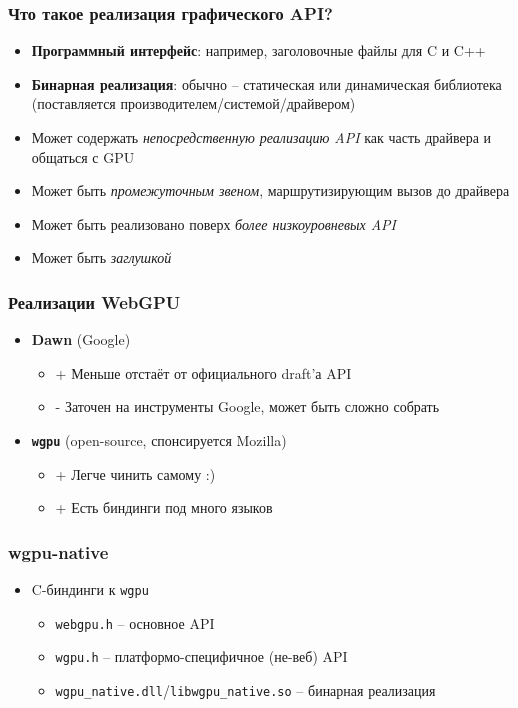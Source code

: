 \documentclass[10pt]{beamer}
\begin{document}
\begin{frame}[fragile]
\frametitle{Что такое реализация графического API?}
\pause
\begin{itemize}
\item \textbf{Программный интерфейс}: например, заголовочные файлы для C и C++
\pause
\item \textbf{Бинарная реализация}: обычно -- статическая или динамическая библиотека (поставляется производителем/системой/драйвером)
\pause
\item Может содержать \textit{непосредственную реализацию API} как часть драйвера и общаться с GPU
\pause
\item Может быть \textit{промежуточным звеном}, маршрутизирующим вызов до драйвера
\pause
\item Может быть реализовано поверх \textit{более низкоуровневых API}
\pause
\item Может быть \textit{заглушкой}
\end{itemize}
\end{frame}

\begin{frame}[fragile]
\frametitle{Реализации WebGPU}
\begin{itemize}
\item \textbf{Dawn} (Google)
\pause
\begin{itemize}
\item {\color{green}+} Меньше отстаёт от официального draft'а API
\item {\color{red}-} Заточен на инструменты Google, может быть сложно собрать
\end{itemize}
\pause
\item \textbf{\nolinkurl{wgpu}} (open-source, спонсируется Mozilla)
\pause
\begin{itemize}
\item {\color{green}+} Легче чинить самому :)
\item {\color{green}+} Есть биндинги под много языков
\end{itemize}
\end{itemize}
\end{frame}

\begin{frame}[fragile]
\frametitle{wgpu-native}
\begin{itemize}
\item C-биндинги к \nolinkurl{wgpu}
\pause
\begin{itemize}
\item \nolinkurl{webgpu.h} -- основное API
\item \nolinkurl{wgpu.h} -- платформо-специфичное (не-веб) API
\item \nolinkurl{wgpu_native.dll}/\nolinkurl{libwgpu_native.so} -- бинарная реализация
\end{itemize}
\end{itemize}
\end{frame}
\end{document}
